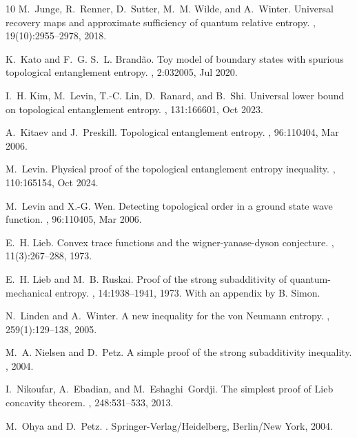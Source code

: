 \documentclass{article}
\numberwithin{equation}{section}
\begin{document}
\begin{thebibliography}{10}
M.~Junge, R.~Renner, D.~Sutter, M.~M. Wilde, and A.~Winter.
\newblock Universal recovery maps and approximate sufficiency of quantum
  relative entropy.
, 19(10):2955--2978, 2018.

K.~Kato and F.~G. S.~L. Brand\~ao.
\newblock Toy model of boundary states with spurious topological entanglement
  entropy.
, 2:032005, Jul 2020.

I.~H. Kim, M.~Levin, T.-C. Lin, D.~Ranard, and B.~Shi.
\newblock Universal lower bound on topological entanglement entropy.
, 131:166601, Oct 2023.

A.~Kitaev and J.~Preskill.
\newblock Topological entanglement entropy.
, 96:110404, Mar 2006.

M.~Levin.
\newblock Physical proof of the topological entanglement entropy inequality.
, 110:165154, Oct 2024.

M.~Levin and X.-G. Wen.
\newblock Detecting topological order in a ground state wave function.
, 96:110405, Mar 2006.

E.~H. Lieb.
\newblock Convex trace functions and the wigner-yanase-dyson conjecture.
, 11(3):267--288, 1973.

E.~H. Lieb and M.~B. Ruskai.
\newblock Proof of the strong subadditivity of quantum-mechanical entropy.
, 14:1938--1941, 1973.
\newblock With an appendix by B. Simon.

N.~Linden and A.~Winter.
\newblock A new inequality for the von {N}eumann entropy.
, 259(1):129--138, 2005.

M.~A. Nielsen and D.~Petz.
\newblock A simple proof of the strong subadditivity inequality.
, 2004.

I.~Nikoufar, A.~Ebadian, and M.~Eshaghi~Gordji.
\newblock The simplest proof of {L}ieb concavity theorem.
, 248:531--533, 2013.

M.~Ohya and D.~Petz.
.
\newblock Springer-Verlag/Heidelberg, Berlin/New York, 2004.


\end{thebibliography}
\end{document}

